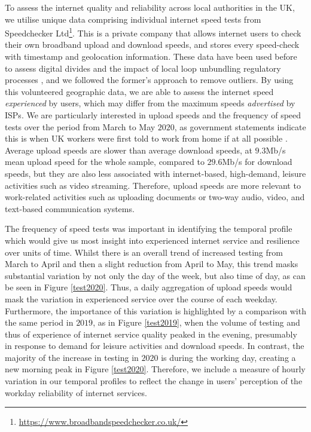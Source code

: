 \documentclass[Royal,times,sageh]{sagej}
\begin{document}
To assess the internet quality and reliability across local authorities
in the UK, we utilise unique data comprising individual internet speed
tests from Speedchecker Ltd\footnote{\url{https://www.broadbandspeedchecker.co.uk/}}.
This is a private company that allows internet users to check their own
broadband upload and download speeds, and stores every speed-check with
timestamp and geolocation information. These data have been used before
to assess digital divides \citep{riddlesden2014broadband} and the impact
of local loop unbundling regulatory processes
\citep{nardotto2015unbundling}, and we followed the former's approach to
remove outliers. By using this volunteered geographic data, we are able
to assess the internet speed \emph{experienced} by users, which may
differ from the maximum speeds \emph{advertised} by ISPs. We are
particularly interested in upload speeds and the frequency of speed
tests over the period from March to May \(2020\), as government
statements indicate this is when UK workers were first told to work from
home if at all possible \citep{GovUK2020}. Average upload speeds are
slower than average download speeds, at \(9.3\)Mb/s mean upload speed
for the whole sample, compared to \(29.6\)Mb/s for download speeds, but
they are also less associated with internet-based, high-demand, leisure
activities such as video streaming. Therefore, upload speeds are more
relevant to work-related activities such as uploading documents or
two-way audio, video, and text-based communication systems.

The frequency of speed tests was important in identifying the temporal
profile which would give us most insight into experienced internet
service and resilience over units of time. Whilst there is an overall
trend of increased testing from March to April and then a slight
reduction from April to May, this trend masks substantial variation by
not only the day of the week, but also time of day, as can be seen in
Figure \ref{test2020}. Thus, a daily aggregation of upload speeds would
mask the variation in experienced service over the course of each
weekday. Furthermore, the importance of this variation is highlighted by
a comparison with the same period in \(2019\), as in Figure
\ref{test2019}, when the volume of testing and thus of experience of
internet service quality peaked in the evening, presumably in response
to demand for leisure activities and download speeds. In contrast, the
majority of the increase in testing in \(2020\) is during the working
day, creating a new morning peak in Figure \ref{test2020}. Therefore, we
include a measure of hourly variation in our temporal profiles to
reflect the change in users' perception of the workday reliability of
internet services.
\end{document}

